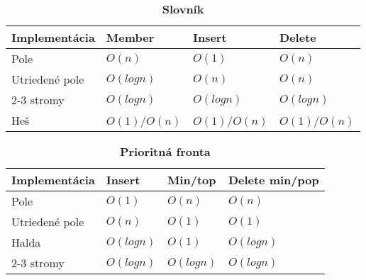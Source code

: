 		\begin{table}[h]
			\centering
			\caption{\textbf{Slovník}}
			\label{my-label}
			\begin{tabular}{|l|l|l|l|}
			\hline
			\textbf{Implementácia} & \textbf{Member} & \textbf{Insert} & \textbf{Delete}  \\ \hline
			Pole                   & $O(n)$            & $O(1)$           & $O(n)$             \\ \hline
			Utriedené pole         & $O(log n)$        & $O(n)$            & $O(n)$             \\ \hline
			2-3 stromy             & $O(log n)$        & $O(log n)$        & $O(log n)$          \\ \hline
			Heš                    & $O(1)$/$O(n)$      & $O(1)$/$O(n)$       & $O(1)$/$O(n)$        \\ \hline
			\end{tabular}
		\end{table}

		\begin{table}[h]
			\centering
			\caption{\textbf{Prioritná fronta}}
			\label{my-label}
			\begin{tabular}{|l|l|l|l|}
			\hline
			\textbf{Implementácia} & \textbf{Insert} & \textbf{Min/top} & \textbf{Delete min/pop}   \\ \hline
			Pole                   & $O(1)$            & $O(n)$             & $O(n)$                       \\ \hline
			Utriedené pole         & $O(n)$            & $O(1)$             & $O(1)$                       \\ \hline
			Halda                  & $O(log n)$        & $O(1)$             & $O(log n)$                  \\ \hline
			2-3 stromy             & $O(log n)$        & $O(log n)$         & $O(log n)$                   \\ \hline
			\end{tabular}
		\end{table}